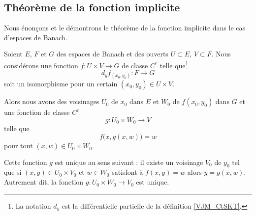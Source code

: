 \subsection{Théorème de la fonction implicite}

Nous énonçons et le démontrons le théorème de la fonction implicite dans le cas d'espaces de Banach.
\begin{theorem} \label{ThoAcaWho}
    Soient \( E\), \( F\) et \( G\) des espaces de Banach et des ouverts \( U\subset E\), \( V\subset F\). Nous considérons une fonction \( f\colon U\times V\to G\) de classe \( C^r\) telle que\footnote{La notation \( d_y\) est la différentielle partielle de la définition \ref{VJM_CtSKT}.}
    \begin{equation}
        d_yf_{(x_0,y_0)}\colon F\to G
    \end{equation}
    soit un isomorphisme pour un certain \( (x_0,y_0)\in U\times V\).

    Alors nous avons des voisinages \( U_0\) de \( x_0\) dans \( E\) et \( W_0\) de \( f(x_0,y_0)\) dans \( G\) et une fonction de classe \( C^r\) 
    \begin{equation}
        g\colon U_0\times W_0\to V
    \end{equation}
    telle que 
    \begin{equation}
        f\big( x,g(x,w) \big)=w
    \end{equation}
    pour tout \( (x,w)\in U_0\times W_0\).
    
    Cette fonction \( g\) est unique au sens suivant : il existe un voisinage \( V_0 \) de \( y_0\) tel que si \( (x,y)\in U_0\times V_0\) et \( w\in W_0\) satisfont à \( f(x,y)=w\) alors \( y=g(x,w)\). Autrement dit, la fonction \( g\colon U_0\times W_0\to V_0\) est unique.
\end{theorem}

